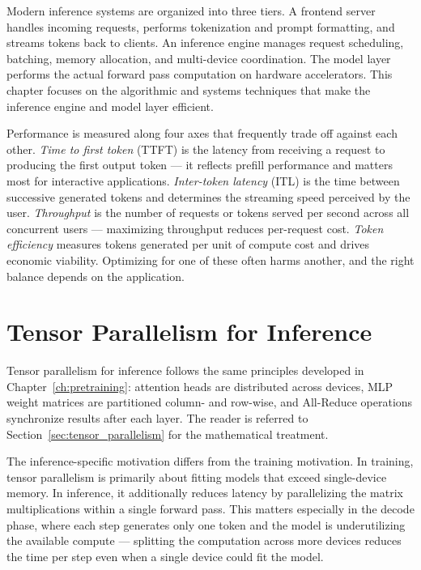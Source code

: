 \documentclass{book}
\begin{document}
Modern inference systems are organized into three tiers. A frontend server
handles incoming requests, performs tokenization and prompt formatting, and
streams tokens back to clients. An inference engine manages request
scheduling, batching, memory allocation, and multi-device coordination. The
model layer performs the actual forward pass computation on hardware
accelerators. This chapter focuses on the algorithmic and systems techniques
that make the inference engine and model layer efficient.

Performance is measured along four axes that frequently trade off against
each other. \emph{Time to first token} (TTFT) is the latency from receiving
a request to producing the first output token --- it reflects prefill
performance and matters most for interactive applications. \emph{Inter-token
latency} (ITL) is the time between successive generated tokens and determines
the streaming speed perceived by the user. \emph{Throughput} is the number
of requests or tokens served per second across all concurrent users ---
maximizing throughput reduces per-request cost. \emph{Token efficiency}
measures tokens generated per unit of compute cost and drives economic
viability. Optimizing for one of these often harms another, and the right
balance depends on the application.

\section{Tensor Parallelism for Inference}
\label{sec:tp_inference}

Tensor parallelism for inference follows the same principles developed in
Chapter~\ref{ch:pretraining}: attention heads are distributed across
devices, MLP weight matrices are partitioned column- and row-wise, and
All-Reduce operations synchronize results after each layer. The reader
is referred to Section~\ref{sec:tensor_parallelism} for the mathematical
treatment.

The inference-specific motivation differs from the training motivation.
In training, tensor parallelism is primarily about fitting models that
exceed single-device memory. In inference, it additionally reduces latency
by parallelizing the matrix multiplications within a single forward pass.
This matters especially in the decode phase, where each step generates
only one token and the model is underutilizing the available compute ---
splitting the computation across more devices reduces the time per step even
when a single device could fit the model.
\end{document}
